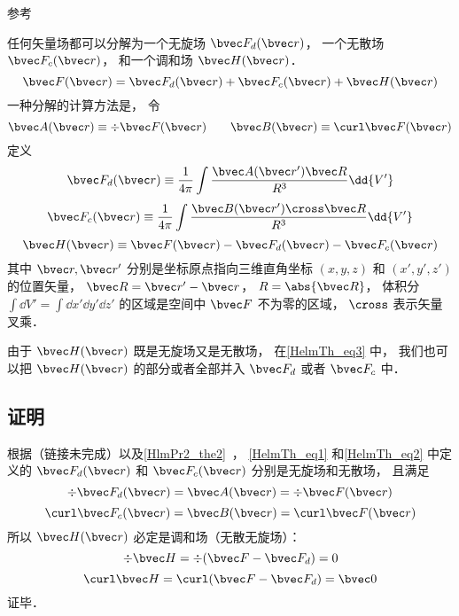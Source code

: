
\begin{issues}
\issueDraft
\end{issues}

参考 \cite{GriffE}

任何矢量场都可以分解为一个无旋场 $\bvec F_{d}(\bvec r)$， 一个无散场 $\bvec F_{c}(\bvec r)$， 和一个调和场 $\bvec H(\bvec r)$．%
\begin{equation}\label{HelmTh_eq3}
\bvec F(\bvec r) = \bvec F_{d}(\bvec r) + \bvec F_{c}(\bvec r) + \bvec H(\bvec r)
\end{equation}
一种分解的计算方法是， 令
\begin{equation}
\bvec A(\bvec r) \equiv \div \bvec F(\bvec r) \qquad
\bvec B(\bvec r) \equiv \curl \bvec F(\bvec r)
\end{equation}
定义
\begin{equation}\label{HelmTh_eq1}
\bvec F_{d}(\bvec r) \equiv \frac{1}{4\pi}\int \frac{\bvec A(\bvec r') \bvec R}{R^3} \dd{V'}
\end{equation}
\begin{equation}\label{HelmTh_eq2}
\bvec F_{c}(\bvec r) \equiv \frac{1}{4\pi}\int \frac{\bvec B(\bvec r')\cross \bvec R}{R^3} \dd{V'}
\end{equation}
\begin{equation}
\bvec H(\bvec r) \equiv \bvec F(\bvec r) - \bvec F_{d}(\bvec r) - \bvec F_{c}(\bvec r)
\end{equation}
其中 $\bvec r, \bvec r'$ 分别是坐标原点指向三维直角坐标 $(x, y, z)$ 和 $(x', y', z')$ 的位置矢量， $\bvec R = \bvec r' - \bvec r$， $R = \abs{\bvec R}$， 体积分 $\int\dd{V'} = \int\dd{x'}\dd{y'}\dd{z'}$ 的区域是空间中 $\bvec F$ 不为零的区域， $\cross$ 表示矢量叉乘．

由于 $\bvec H(\bvec r)$ 既是无旋场又是无散场， 在\autoref{HelmTh_eq3} 中， 我们也可以把 $\bvec H(\bvec r)$ 的部分或者全部并入 $\bvec F_d$ 或者 $\bvec F_c$ 中．

\subsection{证明}
根据（链接未完成）以及\autoref{HlmPr2_the2}~， \autoref{HelmTh_eq1} 和\autoref{HelmTh_eq2} 中定义的 $\bvec F_{d}(\bvec r)$ 和 $\bvec F_{c}(\bvec r)$ 分别是无旋场和无散场， 且满足
\begin{equation}
\div \bvec F_d(\bvec r) = \bvec A(\bvec r) = \div \bvec F(\bvec r)
\end{equation}
\begin{equation}
\curl \bvec F_c(\bvec r) = \bvec B(\bvec r) = \curl \bvec F(\bvec r)
\end{equation}
所以 $\bvec H(\bvec r)$ 必定是调和场（无散无旋场）：
\begin{equation}
\div \bvec H = \div (\bvec F - \bvec F_d) = 0
\end{equation}
\begin{equation}
\curl \bvec H = \curl (\bvec F - \bvec F_d) = \bvec 0
\end{equation}
证毕．


